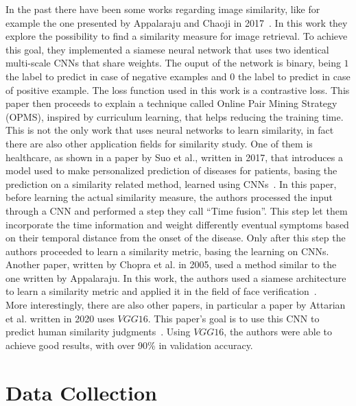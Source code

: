 \documentclass[conference]{IEEEtran}
\begin{document}
				In the past there have been some works regarding image similarity, like for example the one presented by Appalaraju and Chaoji in 2017~\cite{appalaraju2017image}. In this work they explore the possibility to 
				find a similarity measure for image retrieval. To achieve this goal, they implemented a siamese neural network that uses two identical multi-scale CNNs that share weights. The ouput of the 
				network is binary, being $1$ the label to predict in case of negative examples and $0$ the label to predict in case of positive example. The loss function used in this work is a contrastive loss. This paper 
				then proceeds to explain a technique called Online Pair Mining Strategy (OPMS), inspired by curriculum learning, that helps reducing the training time. \\
				This is not the only work that uses neural networks to learn similarity, in fact there are also other application fields for similarity study. One of them is healthcare, as shown in a paper by Suo et al., written in 
				2017, that introduces a model used to make personalized prediction of diseases for patients, basing the prediction on a similarity related method, learned using CNNs~\cite{8217759}. In this paper, before 
				learning the actual similarity measure, the authors processed the input through a CNN and performed a step they call ``Time fusion''. This step let them incorporate the time information and 
				weight differently eventual symptoms based on their temporal distance from the onset of the disease. Only after this step the authors proceeded to learn a similarity metric, basing the learning 
				on CNNs.\\
				Another paper, written by Chopra et al. in 2005, used a method similar to the one written by Appalaraju. In this work, the authors used a siamese architecture to learn a similarity metric and applied it 
				in the field of face verification~\cite{chopra2005learning}.\\
				More interestingly, there are also other papers, in particular a paper by Attarian et al. written in 2020 uses $VGG16$. This paper's goal is to use this CNN to predict human similarity 
				judgments~\cite{attarian2020transforming}. Using $VGG16$, the authors were able to achieve good results, with over 90\% in validation accuracy.
				
	\section{Data Collection}
\end{document}
